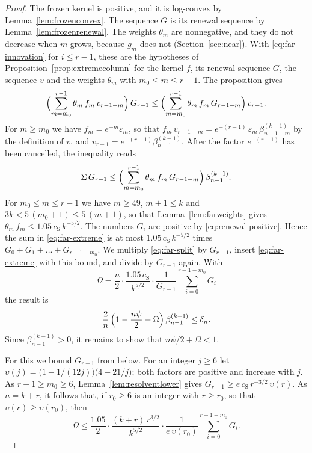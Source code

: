 \documentclass{amsart}
\theoremstyle{definition}
\theoremstyle{remark}
\numberwithin{equation}{section}
\begin{document}
\begin{proof}
The frozen kernel is positive, and it is log-convex by
Lemma~\ref{lem:frozenconvex}. The sequence $G$ is its renewal sequence by
Lemma~\ref{lem:frozenrenewal}. The weights $\theta_m$ are nonnegative, and
they do not decrease when $m$ grows, because $g_m$ does not
(Section~\ref{sec:near}). With \eqref{eq:far-innovation} for $i\le r-1$,
these are the hypotheses of Proposition~\ref{prop:extremecolumn} for the
kernel $f$, its renewal sequence $G$, the sequence $v$ and the weights
$\theta_m$ with $m_0\le m\le r-1$. The proposition gives
\[
\Bigl(\sum_{m=m_0}^{r-1}\theta_m\,f_m\,v_{r-1-m}\Bigr)\,G_{r-1}
\le\Bigl(\sum_{m=m_0}^{r-1}\theta_m\,f_m\,G_{r-1-m}\Bigr)\,v_{r-1}.
\]
For $m\ge m_0$ we have $f_m=e^{-m}\varepsilon_m$, so that
$f_m\,v_{r-1-m}=e^{-(r-1)}\,\varepsilon_m\,\beta^{(k-1)}_{n-1-m}$ by the
definition of $v$, and $v_{r-1}=e^{-(r-1)}\beta^{(k-1)}_{n-1}$. After the
factor $e^{-(r-1)}$ has been cancelled, the inequality reads
\begin{equation}\label{eq:far-extreme}
\Sigma\,G_{r-1}\le\Bigl(\sum_{m=m_0}^{r-1}\theta_m\,f_m\,G_{r-1-m}\Bigr)\,
\beta^{(k-1)}_{n-1}.
\end{equation}
For $m_0\le m\le r-1$ we have $m\ge49$, $m+1\le k$ and
$3k<5\,(m_0+1)\le5\,(m+1)$, so that Lemma~\ref{lem:farweights} gives
$\theta_m\,f_m\le1.05\,c_{\mathrm S}\,k^{-5/2}$. The numbers $G_i$ are
positive by \eqref{eq:renewal-positive}. Hence the sum in
\eqref{eq:far-extreme} is at most $1.05\,c_{\mathrm S}\,k^{-5/2}$ times
$G_0+G_1+\dots+G_{r-1-m_0}$. We multiply
\eqref{eq:far-split} by $G_{r-1}$, insert \eqref{eq:far-extreme} with this
bound, and divide by $G_{r-1}$ again. With
\[
\Omega=\frac n2\cdot\frac{1.05\,c_{\mathrm S}}{k^{5/2}}\cdot
\frac{1}{G_{r-1}}\sum_{i=0}^{r-1-m_0}G_i
\]
the result is
\begin{equation}\label{eq:far-second}
\frac2n\,\Bigl(1-\frac{n\psi}{2}-\Omega\Bigr)\,\beta^{(k-1)}_{n-1}
\le\delta_n .
\end{equation}
Since $\beta^{(k-1)}_{n-1}>0$, it remains to show that $n\psi/2+\Omega<1$.

For this we bound $G_{r-1}$ from below. For an integer $j\ge6$ let
$\upsilon(j)=\bigl(1-1/(12j)\bigr)\bigl(4-21/j\bigr)$; both factors are positive
and increase with $j$. As $r-1\ge m_0\ge6$, Lemma~\ref{lem:resolventlower}
gives $G_{r-1}\ge e\,c_{\mathrm S}\,r^{-3/2}\,\upsilon(r)$. As $n=k+r$, it follows
that, if $r_0\ge6$ is an integer with $r\ge r_0$, so that
$\upsilon(r)\ge\upsilon(r_0)$, then
\begin{equation}\label{eq:far-feedback}
\Omega\le\frac{1.05}{2}\cdot\frac{(k+r)\,r^{3/2}}{k^{5/2}}\cdot
\frac{1}{e\,\upsilon(r_0)}\sum_{i=0}^{r-1-m_0}G_i .
\end{equation}


\end{proof}
\end{document}
